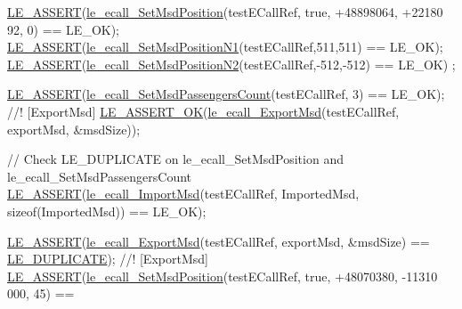 \begin{DoxyCodeInclude}
    \hyperlink{le__log_8h_ac0dbbef91dc0fed449d0092ff0557b39}{LE\_ASSERT}(\hyperlink{le__ecall__interface_8h_a2b56b7b7fd7f936c144d30eba7815908}{le\_ecall\_SetMsdPosition}(testECallRef, \textcolor{keyword}{true}, +48898064, +22180
      92, 0) == LE\_OK);
    \hyperlink{le__log_8h_ac0dbbef91dc0fed449d0092ff0557b39}{LE\_ASSERT}(\hyperlink{le__ecall__interface_8h_af3cfea09eea1b1ba39648798070ad139}{le\_ecall\_SetMsdPositionN1}(testECallRef,511,511) == LE\_OK);
    \hyperlink{le__log_8h_ac0dbbef91dc0fed449d0092ff0557b39}{LE\_ASSERT}(\hyperlink{le__ecall__interface_8h_a6b25b9b242ba114f31ae2f853070bf11}{le\_ecall\_SetMsdPositionN2}(testECallRef,-512,-512) == LE\_OK)
      ;

    \hyperlink{le__log_8h_ac0dbbef91dc0fed449d0092ff0557b39}{LE\_ASSERT}(\hyperlink{le__ecall__interface_8h_a8c009bb03d61dcd0ffbd9e986b692a85}{le\_ecall\_SetMsdPassengersCount}(testECallRef, 3) == 
      LE\_OK);
\textcolor{comment}{}
\textcolor{comment}{    //! [ExportMsd]}
\textcolor{comment}{}    \hyperlink{le__log_8h_a7cd2daa3d4af1de4d29e0eed95187484}{LE\_ASSERT\_OK}(\hyperlink{le__ecall__interface_8h_adc9610dae7a6ba87c064f8dd271a57b4}{le\_ecall\_ExportMsd}(testECallRef, exportMsd, &msdSize));

    \textcolor{comment}{// Check LE\_DUPLICATE on le\_ecall\_SetMsdPosition and le\_ecall\_SetMsdPassengersCount}
    \hyperlink{le__log_8h_ac0dbbef91dc0fed449d0092ff0557b39}{LE\_ASSERT}(\hyperlink{le__ecall__interface_8h_a7d8d8c1e1f49af2f6145836975d20aeb}{le\_ecall\_ImportMsd}(testECallRef, ImportedMsd, \textcolor{keyword}{sizeof}(ImportedMsd))
       == LE\_OK);

    \hyperlink{le__log_8h_ac0dbbef91dc0fed449d0092ff0557b39}{LE\_ASSERT}(\hyperlink{le__ecall__interface_8h_adc9610dae7a6ba87c064f8dd271a57b4}{le\_ecall\_ExportMsd}(testECallRef, exportMsd, &msdSize) == 
      \hyperlink{le__basics_8h_a1cca095ed6ebab24b57a636382a6c86cac26034778a666ee720b110c2fb1647ea}{LE\_DUPLICATE});\textcolor{comment}{}
\textcolor{comment}{    //! [ExportMsd]}
\textcolor{comment}{}
    \hyperlink{le__log_8h_ac0dbbef91dc0fed449d0092ff0557b39}{LE\_ASSERT}(\hyperlink{le__ecall__interface_8h_a2b56b7b7fd7f936c144d30eba7815908}{le\_ecall\_SetMsdPosition}(testECallRef, \textcolor{keyword}{true}, +48070380, -11310
      000, 45) ==
                                                                                

\end{DoxyCodeInclude}
